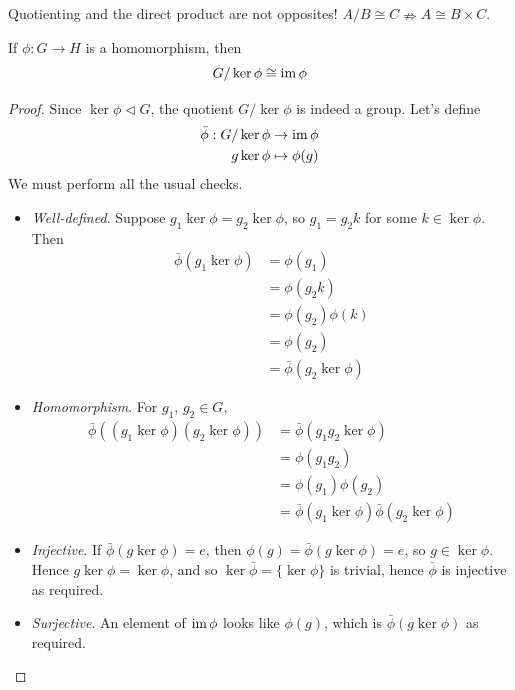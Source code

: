 \documentclass{../../template/note}
\begin{document}
    \begin{remark*}
        Quotienting and the direct product are not opposites! \(A / B \cong C \nRightarrow A \cong B \times C\).
    \end{remark*}
    
    \begin{theorem}
        If \(\phi: G \to H\) is a homomorphism, then
        \[
            G/\ker \phi \cong \operatorname{im} \phi
        \]
        \label{isomorphism-theorem}
    \end{theorem}
    
    \begin{proof}
        Since \(\ker \phi \triangleleft G\), the quotient \(G/\ker \phi\) is indeed a group. Let's define
        \begin{align*}
            \bar\phi: G/\ker\phi &\to \operatorname{im} \phi \\
            g \ker \phi &\mapsto \phi(g)
        \end{align*}
        We must perform all the usual checks.
        \begin{itemize}
            \item \emph{Well-defined}. Suppose \(g_1 \ker \phi = g_2 \ker \phi\), so \(g_1 = g_2 k\) for some \(k \in \ker \phi\). Then
            \begin{align*}
                \bar\phi(g_1 \ker \phi) &= \phi(g_1) \\
                &= \phi(g_2k) \\
                &= \phi(g_2)\phi(k) \\
                &= \phi(g_2) \\
                &= \bar\phi(g_2 \ker \phi)
            \end{align*}
            \item \emph{Homomorphism}. For \(g_1\), \(g_2 \in G\),
            \begin{align*}
                \bar\phi((g_1 \ker \phi)(g_2 \ker \phi)) &= \bar\phi(g_1g_2 \ker \phi) \\
                &= \phi(g_1g_2) \\
                &= \phi(g_1)\phi(g_2) \\
                &= \bar\phi(g_1 \ker \phi)\bar\phi(g_2 \ker \phi)
            \end{align*}
            \item \emph{Injective}. If \(\bar\phi(g \ker \phi) = e\), then \(\phi(g) = \bar\phi(g \ker \phi) = e\), so \(g \in \ker \phi\). Hence \(g \ker \phi = \ker \phi\), and so \(\ker \bar\phi = \{\ker \phi\}\) is trivial, hence \(\bar\phi\) is injective as required.
            \item \emph{Surjective}. An element of \(\operatorname{im} \phi\) looks like \(\phi(g)\), which is \(\bar\phi(g \ker \phi)\) as required.           
        \end{itemize}
    \end{proof}
    
\end{document}
